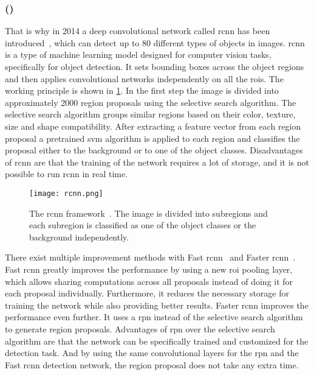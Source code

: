 \subsubsection{ ()}
\label{sssec:rcnn}
That is why in 2014 a deep convolutional network called \gls{rcnn} has been introduced~\cite{Girshick2014}, which can detect up to 80 different types of objects in images.
\gls{rcnn} is a type of machine learning model designed for computer vision tasks, specifically for object detection.
It sets bounding boxes across the object regions and then applies convolutional networks independently on all the \glspl{roi}.
The working principle is shown in \cref{fig:rcnn}.
In the first step the image is divided into approximately 2000 region proposals using the selective search algorithm.
The selective search algorithm groups similar regions based on their color, texture, size and shape compatibility.
After extracting a feature vector from each region proposal a pretrained \gls{svm} algorithm is applied to each region and classifies the proposal either to the background or to one of the object classes.
Disadvantages of \gls{rcnn} are that the training of the network requires a lot of storage, and it is not possible to run \gls{rcnn} in real time.
\begin{figure}[htbp]
    \centering
    \texttt{[image: rcnn.png]}
    \caption[\acrshort{rcnn} framework]{The \acrshort{rcnn} framework~\cite{Girshick2014}. The image is divided into subregions and each subregion is classified as one of the object classes or the background independently.}
    \label{fig:rcnn}
\end{figure}
There exist multiple improvement methods with Fast \gls{rcnn}~\cite{Girshick2015} and Faster \gls{rcnn}~\cite{Ren2017}.
Fast \gls{rcnn} greatly improves the performance by using a new \gls{roi} pooling layer, which allows sharing computations across all proposals instead of doing it for each proposal individually.
Furthermore, it reduces the necessary storage for training the network while also providing better results.
Faster \gls{rcnn} improves the performance even further.
It uses a \gls{rpn} instead of the selective search algorithm to generate region proposals.
Advantages of \gls{rpn} over the selective search algorithm are that the network can be specifically trained and customized for the detection task.
And by using the same convolutional layers for the \gls{rpn} and the Fast \gls{rcnn} detection network, the region proposal does not take any extra time.\par
